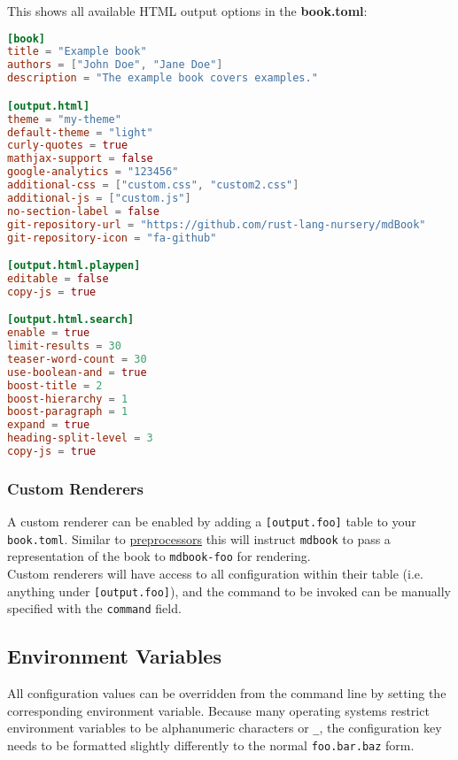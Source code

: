 \documentclass{article}
\begin{document}
This shows all available HTML output options in the \textbf{book.toml}:\\
\begin{lstlisting}[language=toml]
[book]
title = "Example book"
authors = ["John Doe", "Jane Doe"]
description = "The example book covers examples."

[output.html]
theme = "my-theme"
default-theme = "light"
curly-quotes = true
mathjax-support = false
google-analytics = "123456"
additional-css = ["custom.css", "custom2.css"]
additional-js = ["custom.js"]
no-section-label = false
git-repository-url = "https://github.com/rust-lang-nursery/mdBook"
git-repository-icon = "fa-github"

[output.html.playpen]
editable = false
copy-js = true

[output.html.search]
enable = true
limit-results = 30
teaser-word-count = 30
use-boolean-and = true
boost-title = 2
boost-hierarchy = 1
boost-paragraph = 1
expand = true
heading-split-level = 3
copy-js = true

\end{lstlisting}

\subsubsection{Custom Renderers}
\label{Custom Renderers}
\label{custom-renderers}

A custom renderer can be enabled by adding a \lstinline|[output.foo]| table to your
\lstinline|book.toml|. Similar to \hyperref[configuring-preprocessors]{preprocessors} this will
instruct \lstinline|mdbook| to pass a representation of the book to \lstinline|mdbook-foo| for
rendering.\\

Custom renderers will have access to all configuration within their table
(i.e. anything under \lstinline|[output.foo]|), and the command to be invoked can be
manually specified with the \lstinline|command| field.\\

\subsection{Environment Variables}
\label{Environment Variables}
\label{environment-variables}

All configuration values can be overridden from the command line by setting the
corresponding environment variable. Because many operating systems restrict
environment variables to be alphanumeric characters or \lstinline|_|, the configuration
key needs to be formatted slightly differently to the normal \lstinline|foo.bar.baz| form.\\
\end{document}
